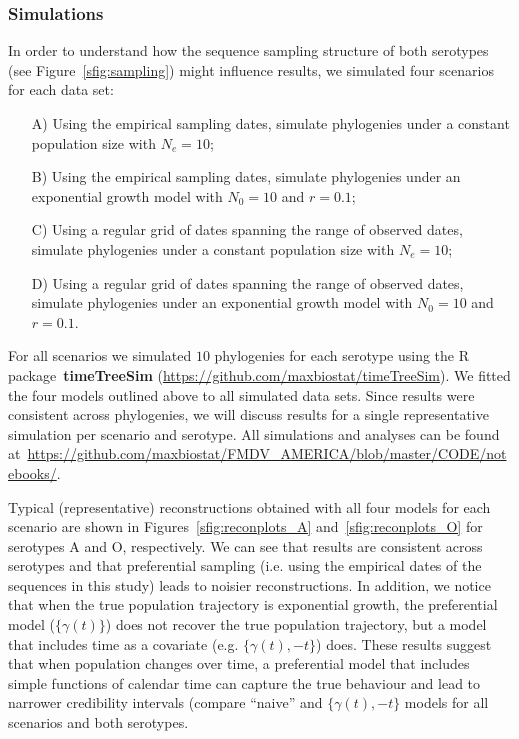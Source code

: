 \documentclass[a4paper,10pt]{article}
\begin{document}
 
\subsubsection*{Simulations}

In order to understand how the sequence sampling structure of both serotypes (see Figure~\ref{sfig:sampling}) might influence results, we simulated four scenarios for each data set:
\begin{itemize}
 \item[A)] Using the empirical sampling dates, simulate phylogenies under a constant population size with $N_e = 10$;
 \item[B)] Using the empirical sampling dates, simulate phylogenies under an exponential growth model with $N_0 = 10$ and $r = 0.1$;
 \item[C)] Using a regular grid of dates spanning the range of observed dates, simulate phylogenies under a constant population size with $N_e = 10$; %
 \item[D)]  Using a regular grid of dates spanning the range of observed dates, simulate phylogenies under an exponential growth model with $N_0 = 10$ and $r = 0.1$.
\end{itemize}
For all scenarios we simulated $10$ phylogenies for each serotype using the R package~\textbf{timeTreeSim} (\url{https://github.com/maxbiostat/timeTreeSim}).
We fitted the four models outlined above to all simulated data sets.
Since results were consistent across phylogenies, we will discuss results for a single representative simulation per scenario and serotype.
All simulations and analyses can be found at~\url{https://github.com/maxbiostat/FMDV_AMERICA/blob/master/CODE/notebooks/}.

Typical (representative) reconstructions obtained with all four models for each scenario are shown in Figures~\ref{sfig:reconplots_A} and~\ref{sfig:reconplots_O} for serotypes A and O, respectively.
We can see that results are consistent across serotypes and that preferential sampling (i.e. using the empirical dates of the sequences in this study) leads to noisier reconstructions.
In addition, we notice that when the true population trajectory is exponential growth, the preferential model ($\{\gamma(t)\}$) does not recover the true population trajectory, but a model that includes time as a covariate (e.g. $\{\gamma(t), -t\}$) does.
These results suggest that when population changes over time, a preferential model that includes simple functions of calendar time can capture the true behaviour and lead to narrower credibility intervals (compare ``naive'' and $\{\gamma(t), -t\}$ models for all scenarios and both serotypes.
\end{document}
